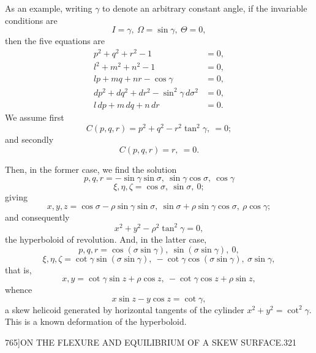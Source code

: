 \documentclass[11pt]{article}
\begin{document}
As an example, writing $\gamma$ to denote an arbitrary constant angle, if the invariable
conditions are
\[
I = \gamma,\ \Omega = \sin\gamma,\ \Theta = 0,
\]
then the five equations are
\begin{align*}
p^2 + q^2 + r^2 - 1 &= 0, \\
l^2 + m^2 + n^2 - 1 &= 0, \\
lp + mq + nr - \cos\gamma &= 0, \\
dp^2 + dq^2 + dr^2 - \sin^2\gamma\,d\sigma^2 &= 0, \\
l\,dp + m\,dq + n\,dr &= 0.
\end{align*}
We assume first
\[
C(p, q, r) = p^2 + q^2 - r^2\tan^2\gamma,\ = 0;
\]
and secondly
\[
C(p, q, r) = r,\ = 0.
\]

Then, in the former case, we find the solution
\[
p, q, r = -\sin\gamma\sin\sigma,\ \sin\gamma\cos\sigma,\ \cos\gamma
\]
\[
\xi, \eta, \zeta = \cos\sigma,\ \sin\sigma,\ 0;
\]
giving
\[
x, y, z = \cos\sigma - \rho\sin\gamma\sin\sigma,\ \sin\sigma + \rho\sin\gamma\cos\sigma,\ \rho\cos\gamma;
\]
and consequently
\[
x^2 + y^2 - \rho^2\tan^2\gamma = 0,
\]
the hyperboloid of revolution. And, in the latter case,
\[
p, q, r = \cos(\sigma\sin\gamma),\ \sin(\sigma\sin\gamma),\ 0,
\]
\[
\xi, \eta, \zeta = \cot\gamma\sin(\sigma\sin\gamma),\ -\cot\gamma\cos(\sigma\sin\gamma),\ \sigma\sin\gamma,
\]
that is,
\[
x, y = \cot\gamma\sin z + \rho\cos z,\ -\cot\gamma\cos z + \rho\sin z,
\]
whence
\[
x\sin z - y\cos z = \cot\gamma,
\]
a skew helicoid generated by horizontal tangents of the cylinder $x^2 + y^2 = \cot^2\gamma$. This
is a known deformation of the hyperboloid.

\begin{center}
{\small 765]\hfill ON THE FLEXURE AND EQUILIBRIUM OF A SKEW SURFACE.\hfill 321}
\end{center}
\end{document}
